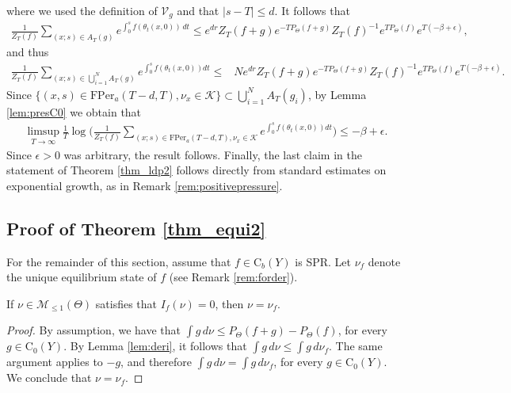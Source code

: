 \documentclass[letterpaper,11pt]{amsart}
\numberwithin{equation}{section}     %
\newcommand{\M}{\mathcal{M}}
\def\M{{\mathcal M}}
\def\le{\leqslant}
\def\M{\mathcal{M}}
\begin{document}
where we used the definition of $\mathcal{V}_g$ and that $|s-T|\le d$. It follows that
 \begin{align*}
\frac{1}{Z_T(f)}\sum_{(x;s)\in A_T(g) } e^{ \int_0^s f(\theta_t(x,0)) \, dt }  \le e^{dr} Z_T(f+g)e^{-TP_\Theta(f+g)}Z_T(f)^{-1}e^{TP_\Theta(f)}e^{T(-\beta+\epsilon)},
\end{align*}
and thus
 \begin{align*}
\frac{1}{Z_T(f)}\sum_{(x;s)\in \bigcup_{i=1}^N A_T(g) } e^{ \int_0^s f(\theta_t(x,0)) dt }  \le&   Ne^{dr} Z_T(f+g)e^{-TP_\Theta(f+g)}Z_T(f)^{-1}e^{TP_\Theta(f)}e^{T(-\beta+\epsilon)}.
\end{align*}
Since $\{{(x,s)\in \mathrm{FPer}_a(T-d,T), \nu_{x}\in \mathcal{K}}\}\subset \bigcup_{i=1}^N A_T(g_i)$, by Lemma \ref{lem:presC0} we obtain that 
 \begin{align*}
\limsup_{T\to\infty}\frac{1}{T}\log\bigg(\frac{1}{Z_T(f)}\sum_{{(x;s)\in \mathrm{FPer}_a(T-d,T), \nu_{x}\in \mathcal{K}}} e^{ \int_0^s f(\theta_t(x,0)) dt }  \bigg)\le -\beta+\epsilon.
\end{align*}
Since $\epsilon>0$ was arbitrary,  the result follows. Finally, the last claim in the statement of Theorem \ref{thm_ldp2} follows directly from standard estimates on exponential growth, as in Remark \ref{rem:positivepressure}. 






\subsection{Proof of Theorem \ref{thm_equi2}} 
For the remainder of this section, assume that $f \in \mathrm{C}_b(Y)$ is SPR. Let $\nu_f$ denote the unique equilibrium state of $f$ (see Remark \ref{rem:forder}).

\begin{lemma} \label{lem:beta} If $\nu\in \M_{\le1}(\Theta)$ satisfies that $I_f(\nu)=0$, then $\nu=\nu_f$. 
\end{lemma}

\begin{proof} By assumption, we have that $\int g  \, d \nu \le P_\Theta(f+g)-P_\Theta(f)$, for every $g\in \mathrm{C}_0(Y)$. By Lemma \ref{lem:deri}, it follows that $\int g \, d\nu\le \int g \, d\nu_f$. The same argument applies to $-g$, and therefore $\int g \, d\nu= \int g \, d\nu_f$, for every $g\in \mathrm{C}_0(Y)$. We conclude that $\nu=\nu_f$.
\end{proof}
\end{document}
